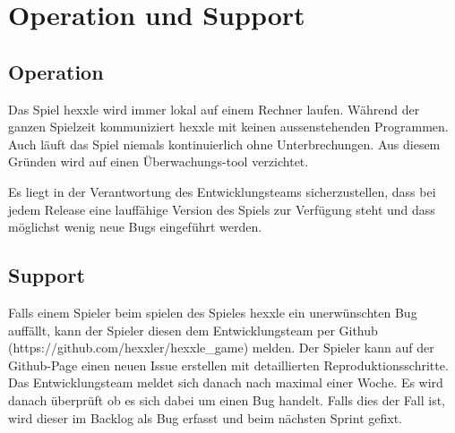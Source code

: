 \documentclass[../main.tex]{subfiles}
\begin{document}
    
    \section{Operation und Support}

    \subsection{Operation}
    \par Das Spiel \gls{hexxle} wird immer lokal auf einem Rechner laufen. Während der ganzen Spielzeit kommuniziert \gls{hexxle} mit keinen aussenstehenden Programmen. Auch läuft das Spiel niemals kontinuierlich ohne Unterbrechungen. Aus diesem Gründen wird auf einen Überwachungs-tool verzichtet. 
   
   \par Es liegt in der Verantwortung des Entwicklungsteams sicherzustellen, dass bei jedem Release eine lauffähige Version des Spiels zur Verfügung steht und dass möglichst wenig neue Bugs eingeführt werden. 

    \subsection{Support}
    \par Falls einem Spieler beim spielen des Spieles \gls{hexxle} ein unerwünschten Bug auffällt, kann der Spieler diesen dem Entwicklungsteam per Github (https://github.com/hexxler/hexxle_game) melden. Der Spieler kann auf der Github-Page einen neuen Issue erstellen mit detaillierten Reproduktionsschritte. Das Entwicklungsteam meldet sich danach nach maximal einer Woche. Es wird danach überprüft ob es sich dabei um einen Bug handelt. Falls dies der Fall ist, wird dieser im Backlog als Bug erfasst und beim nächsten Sprint gefixt. 
 
\end{document}
